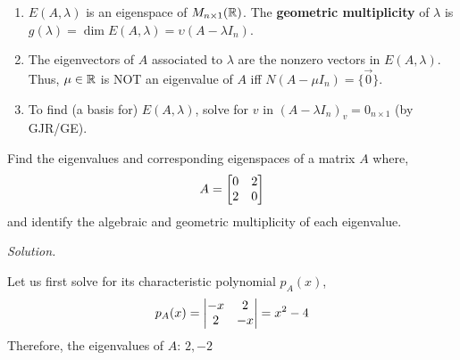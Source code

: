 \begin{remark}
\leavevmode
\begin{enumerate}
    \item $E(A, \lambda)$ is an eigenspace of $M_{n \times 1}(\mathbb{R})$. The \textbf{geometric multiplicity} of $\lambda$ is $g(\lambda) = \dim E(A, \lambda) = \upsilon(A - \lambda I_n)$.
    \item The eigenvectors of $A$ associated to $\lambda$ are the nonzero vectors in $E(A, \lambda)$. Thus, $\mu \in \mathbb{R}$ is NOT an eigenvalue of $A$ iff $N(A - \mu I_n) = \{\vec{0}\}$.
    \item To find (a basis for) $E(A, \lambda)$, solve for $v$ in $(A - \lambda I_n)_v = 0_{n \times 1}$ (by GJR/GE).
\end{enumerate}
\end{remark}

\begin{example}
Find the eigenvalues and corresponding eigenspaces of a matrix $A$ where,
$$A = \begin{bmatrix} 0 & 2 \\ 2 & 0 \end{bmatrix}$$
and identify the algebraic and geometric multiplicity of each eigenvalue.
\end{example}

\textit{Solution.}

Let us first solve for its characteristic polynomial $p_A(x)$,
$$p_A(x) = \begin{vmatrix} -x & 2 \\ 2 & -x \end{vmatrix} = x^2 - 4$$
Therefore, the eigenvalues of $A$: $2, -2$

